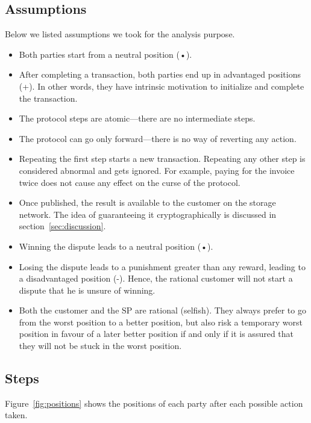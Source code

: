 \documentclass{ieeeaccess}
\begin{document}
\subsection{Assumptions}\label{assumptions}

Below we listed assumptions we took for the analysis purpose.  

\begin{itemize}

\item
    Both parties start from a neutral position (•).
\item
    After completing a transaction, both parties end up in advantaged positions (+). In other words, they have intrinsic motivation to initialize and complete the transaction.
\item
    The protocol steps are atomic—there are no intermediate steps.
\item 
    The protocol can go only forward—there is no way of reverting any action.
\item
    Repeating the first step starts a new transaction. Repeating any other step is considered abnormal and gets ignored. For example, paying for the invoice twice does not cause any effect on the curse of the protocol.
\item 
    Once published, the result is available to the customer on the storage network. The idea of guaranteeing it cryptographically is discussed in section~\ref{sec:discussion}.
    
\item
    Winning the dispute leads to a neutral position (•).

\item
    Losing the dispute leads to a punishment greater than any reward, leading to a disadvantaged position (-). Hence, the rational customer will not start a dispute that he is unsure of winning.
\item
    Both the customer and the SP are rational (selfish). They always prefer to go from the worst position to a better position, but also risk a temporary worst position in favour of a later better position if and only if it is assured that they will not be stuck in the worst position.
\end{itemize}

\subsection{Steps}\label{sec:steps}

Figure~\ref{fig:positions} shows the positions of each party after each possible action taken.
\end{document}
